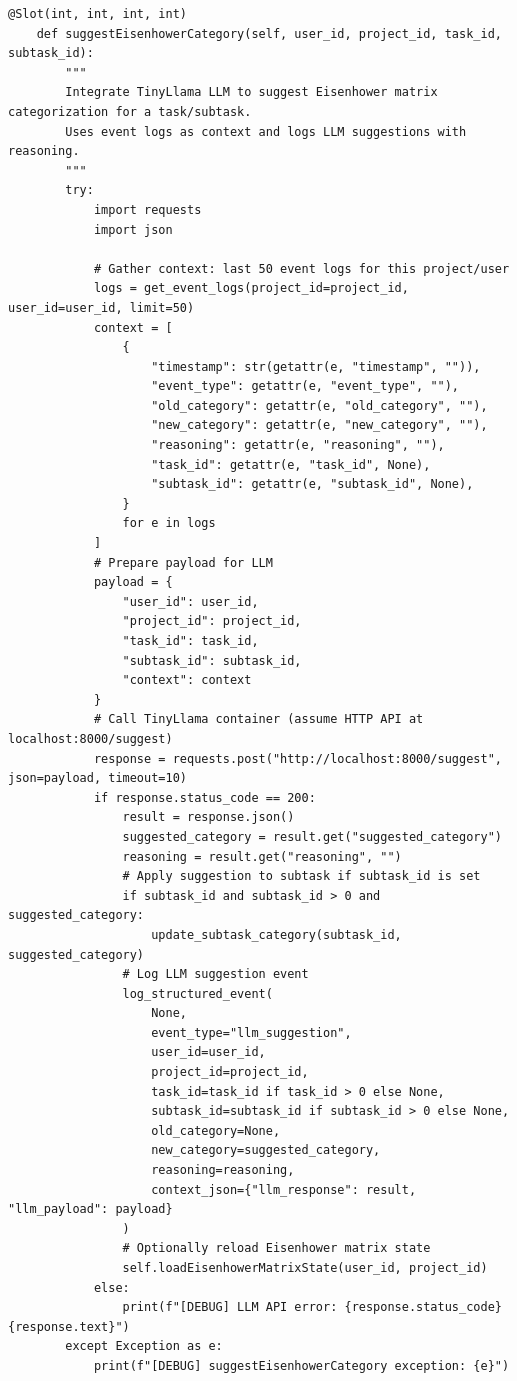 \documentclass{report}
\begin{document}
\begin{lstlisting}[style=pythonstyle]
    @Slot(int, int, int, int)
    def suggestEisenhowerCategory(self, user_id, project_id, task_id, subtask_id):
        """
        Integrate TinyLlama LLM to suggest Eisenhower matrix categorization for a task/subtask.
        Uses event logs as context and logs LLM suggestions with reasoning.
        """
        try:
            import requests
            import json

            # Gather context: last 50 event logs for this project/user
            logs = get_event_logs(project_id=project_id, user_id=user_id, limit=50)
            context = [
                {
                    "timestamp": str(getattr(e, "timestamp", "")),
                    "event_type": getattr(e, "event_type", ""),
                    "old_category": getattr(e, "old_category", ""),
                    "new_category": getattr(e, "new_category", ""),
                    "reasoning": getattr(e, "reasoning", ""),
                    "task_id": getattr(e, "task_id", None),
                    "subtask_id": getattr(e, "subtask_id", None),
                }
                for e in logs
            ]
            # Prepare payload for LLM
            payload = {
                "user_id": user_id,
                "project_id": project_id,
                "task_id": task_id,
                "subtask_id": subtask_id,
                "context": context
            }
            # Call TinyLlama container (assume HTTP API at localhost:8000/suggest)
            response = requests.post("http://localhost:8000/suggest", json=payload, timeout=10)
            if response.status_code == 200:
                result = response.json()
                suggested_category = result.get("suggested_category")
                reasoning = result.get("reasoning", "")
                # Apply suggestion to subtask if subtask_id is set
                if subtask_id and subtask_id > 0 and suggested_category:
                    update_subtask_category(subtask_id, suggested_category)
                # Log LLM suggestion event
                log_structured_event(
                    None,
                    event_type="llm_suggestion",
                    user_id=user_id,
                    project_id=project_id,
                    task_id=task_id if task_id > 0 else None,
                    subtask_id=subtask_id if subtask_id > 0 else None,
                    old_category=None,
                    new_category=suggested_category,
                    reasoning=reasoning,
                    context_json={"llm_response": result, "llm_payload": payload}
                )
                # Optionally reload Eisenhower matrix state
                self.loadEisenhowerMatrixState(user_id, project_id)
            else:
                print(f"[DEBUG] LLM API error: {response.status_code} {response.text}")
        except Exception as e:
            print(f"[DEBUG] suggestEisenhowerCategory exception: {e}")



\end{lstlisting}
\end{document}

